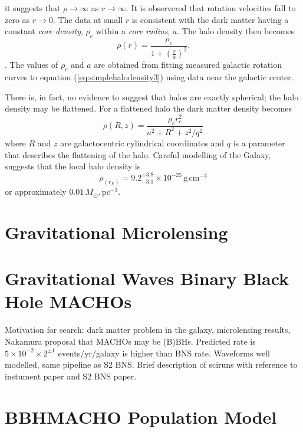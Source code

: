 it suggests that $\rho \rightarrow \infty$ as $r \rightarrow \infty$. It is
observered that rotation velocities fall to zero as $r\rightarrow 0$. The data
at small $r$ is consistent with the dark matter having a constant \emph{core
density}, $\rho_c$ within a \emph{core radius}, $a$. The halo density then
becomes
\begin{equation}
\rho(r) = \frac{\rho_c}{1 + \left(\frac{r}{a}\right)^2}.
\label{eq:simplehalodensity3}
\end{equation}.
The values of $\rho_c$ and $a$ are obtained from fitting measured galactic
rotation curves to equation (\ref{eq:simplehalodensity3}) using data near the
galactic center. 

There is, in fact, no evidence to suggest that halos are
exactly spherical; the halo density may be flattened\cite{Rix:1996}. For a
flattened halo the dark matter density becomes
\begin{equation}
\rho(R,z) = \frac{\rho_c r^2_c}{a^2 + R^2 + z^2/q^2}
\label{eq:simplehalodensity4}
\end{equation}
where $R$ and $z$ are galactocentric cylindrical coordinates and $q$ is a
parameter that describes the flattening of the halo. Careful modelling of the
Galaxy\cite{1995ApJ...449L.123G}, suggests that the local halo density is
\begin{equation}
\rho_(r_E) = 9.2_{-3.1}^{+3.8} \times 10^{-25}\,  \mathrm{g}\,\mathrm{cm}^{-3}
\end{equation}
or approximately $0.01\,M_\odot.\,\mathrm{pc}^{-3}$.

\section{Gravitational Microlensing}
\label{s:microlensing}

\section{Gravitational Waves Binary Black Hole MACHOs}
\label{s:bbhmacho}

Motivation for search: dark matter problem in the galaxy, microlensing
results, Nakamura proposal that MACHOs may be (B)BHs. Predicted rate is
$5\times10^{-2}\times2^{\pm 1}$ events/yr/galaxy is higher than BNS rate.
Waveforms well modelled, same pipeline as S2 BNS. Brief description of sciruns
with reference to instument paper and S2 BNS paper.

\section{BBHMACHO Population Model}
\label{s:bbhmachopopulation}


